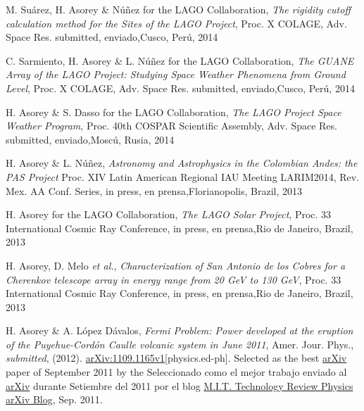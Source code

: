 \begin{etaremune}
\item {}M. Suárez, H. Asorey \& Núñez for the LAGO Collaboration, {\emph{The rigidity cutoff calculation method for the Sites of the LAGO Project}}, \en Proc. X COLAGE, Adv. Space Res. \ifeng submitted, \else enviado,\fi  Cusco, Perú, 2014

\item {}C. Sarmiento, H. Asorey \& L. Núñez for the LAGO Collaboration, {\emph{The GUANE Array of the LAGO Project: Studying Space Weather Phenomena from Ground Level}}, \en Proc. X COLAGE, Adv. Space Res. \ifeng submitted, \else enviado,\fi  Cusco, Perú, 2014

\item {}H. Asorey \& S. Dasso for the LAGO Collaboration, {\emph{The LAGO Project Space Weather Program}}, \en Proc. 40th COSPAR Scientific Assembly, Adv. Space Res. \ifeng submitted, \else enviado,\fi  Moscú, Rusia, 2014

\item {}H. Asorey \& L. Núñez, {\emph{Astronomy and Astrophysics in the Colombian Andes: the PAS Project}} \en Proc. XIV Latin American Regional IAU Meeting LARIM2014, Rev. Mex. AA Conf. Series, \ifeng in press, \else en prensa,\fi  Florianopolis, Brazil, 2013

\item {}H. Asorey for the LAGO Collaboration, {\emph{The LAGO Solar Project}}, \en Proc. 33 International Cosmic Ray Conference, \ifeng in press, \else en prensa,\fi  Rio de Janeiro, Brazil, 2013

\item {}H. Asorey, D. Melo {\emph{et al.}}, {\emph{Characterization of San Antonio de los Cobres for a Cherenkov telescope array in energy range from 20 GeV to 130 GeV}}, \en Proc. 33 International Cosmic Ray Conference, \ifeng in press, \else en prensa,\fi  Rio de Janeiro, Brazil, 2013

\item {}H. Asorey \& A. López Dávalos, {\emph{Fermi Problem: Power
developed at the eruption of the Puyehue-Cordón Caulle volcanic system in June
2011}}, Amer. Jour. Phys., {\emph{submitted}}, (2012).
\href{http://arxiv.org/abs/1109.1165}{arXiv:1109.1165v1}[physics.ed-ph]. 
\ifeng
Selected as the best \href{http://arxiv.org}{arXiv} paper of September 2011 by the
\else
Seleccionado como el mejor trabajo enviado al \href{http://arxiv.org}{arXiv} durante Setiembre del 2011 por el blog 
\fi
\href{http://www.technologyreview.com/blog/arxiv/27140/}{M.I.T. Technology
Review Physics arXiv Blog}, Sep. 2011.


\end{etaremune}
